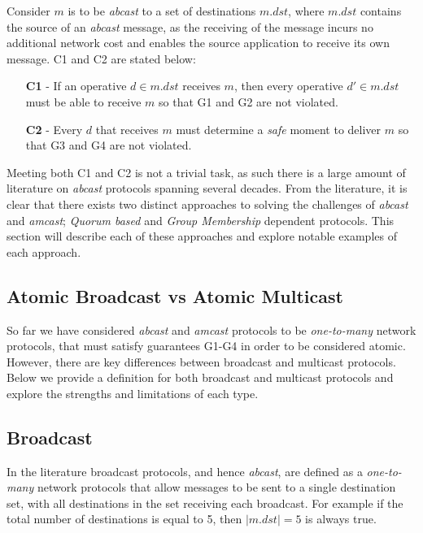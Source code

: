 Consider $m$ is to be \emph{abcast} to a set of destinations $m.dst$, where $m.dst$ contains the source of an \emph{abcast} message, as the receiving of the message incurs no additional network cost and enables the source application to receive its own message.  C1 and C2 are stated below:
\begin{itemize}
    \item[\textbf{C1}] - If an operative $d \in m.dst$ receives $m$, then every operative
     $d' \in m.dst$ must be able to receive $m$ so that G1 and G2 are not violated.
    \item[\textbf{C2}] - Every $d$ that receives $m$ must determine a \emph{safe} moment
to deliver $m$ so that G3 and G4 are not violated.
\end{itemize}

Meeting both C1 and C2 is not a trivial task, as such there is a large amount of literature\cite{Defago:2004:TOB:1041680.1041682} on \emph{abcast} protocols spanning several decades.  From the literature, it is clear that there exists two distinct approaches to solving the challenges of \emph{abcast} and \emph{amcast}; \emph{Quorum based} and \emph{Group Membership} dependent protocols.  This section will describe each of these approaches and explore notable examples of each approach.  
	
	\subsection{Atomic Broadcast vs Atomic Multicast}
	So far we have considered \emph{abcast} and \emph{amcast} protocols to be \emph{one-to-many} network protocols, that must satisfy guarantees G1-G4 in order to be considered atomic.  However, there are key differences between broadcast and multicast protocols.  Below we provide a definition for both broadcast and multicast protocols and explore the strengths and limitations of each type.  
	
	\subsection{Broadcast}\label{ssec:atomic_broadcast}
	In the literature\cite{Defago:2004:TOB:1041680.1041682} broadcast protocols, and hence \emph{abcast}, are defined as a \emph{one-to-many} network protocols that allow messages to be sent to a single destination set, with all destinations in the set receiving each broadcast.  For example if the total number of destinations is equal to 5, then $\left\vert{m.dst}\right\vert = 5$ is always true.
	
